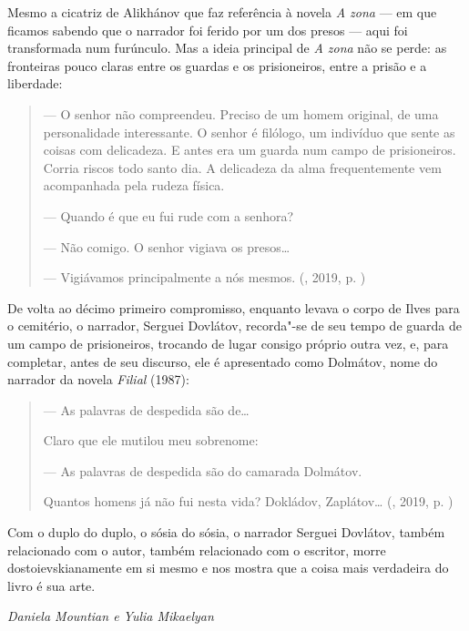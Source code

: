 Mesmo a cicatriz de Alikhánov que faz referência à novela \emph{A zona} --- em
que ficamos sabendo que o narrador foi ferido por um dos presos --- aqui
foi transformada num furúnculo. Mas a ideia principal de \emph{A zona}
não se perde: as fronteiras pouco claras entre os guardas e os
prisioneiros, entre a prisão e a liberdade:

\begin{quotation}
--- O senhor não compreendeu. Preciso de um homem original, de uma
personalidade interessante. O senhor é filólogo, um indivíduo que sente
as coisas com delicadeza. E antes era um guarda num campo de
prisioneiros. Corria riscos todo santo dia. A delicadeza da alma
frequentemente vem acompanhada pela rudeza física.

--- Quando é que eu fui rude com a senhora?

--- Não comigo. O senhor vigiava os presos\ldots{}

--- Vigiávamos principalmente a nós mesmos. 
{}(, 2019, p. \pageref{ref8})
\end{quotation}

De volta ao décimo primeiro compromisso, enquanto levava o corpo de
Ilves para o cemitério, o narrador, Serguei Dovlátov, recorda"-se de seu
tempo de guarda de um campo de prisioneiros, trocando de lugar consigo
próprio outra vez, e, para completar, antes de seu discurso, ele é
apresentado como Dolmátov, nome do narrador da novela \emph{Filial}
(1987):

\begin{quotation}
--- As palavras de despedida são de\ldots{}

Claro que ele mutilou meu sobrenome:

--- As palavras de despedida são do camarada Dolmátov.

Quantos homens já não fui nesta vida? Dokládov, Zaplátov\ldots{}
{}(, 2019, p. \pageref{ref9})
\end{quotation}

Com o duplo do duplo, o sósia do sósia, o narrador Serguei Dovlátov,
também relacionado com o autor, também relacionado com o escritor, morre
dostoievskianamente em si mesmo e nos mostra que a coisa mais verdadeira
do livro é sua arte.

\vfill
\begin{flushright}
\emph{Daniela Mountian e Yulia Mikaelyan}
\end{flushright}
